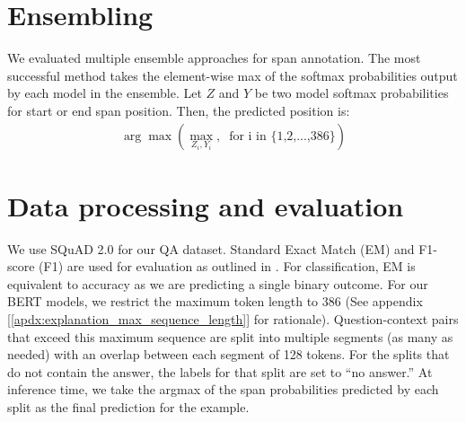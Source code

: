 \section{Ensembling} 

We evaluated multiple ensemble approaches for span annotation. The most successful method takes the element-wise max of the softmax probabilities output by each model in the ensemble. Let $Z$ and $Y$ be two model softmax probabilities for start or end span position. Then, the predicted position is:
\begin{equation} \label{eq2}
\begin{aligned}
\arg\max\left(\underset{{Z_i, Y_i}}{\max},\;\;\text{for i in \{1,2,...,386\}}\right)
\end{aligned}
\end{equation}

\section{Data processing and evaluation}

We use SQuAD 2.0 for our QA dataset. Standard Exact Match (EM) and F1-score (F1) are used for evaluation as outlined in \cite{DBLP:journals/corr/abs-1806-03822}. For classification, EM is equivalent to accuracy as we are predicting a single binary outcome. For our BERT models, we restrict the maximum token length to 386 (See appendix [\ref{apdx:explanation_max_sequence_length}] for rationale). Question-context pairs that exceed this maximum sequence are split into multiple segments (as many as needed) with an overlap between each segment of 128 tokens. For the splits that do not contain the answer, the labels for that split are set to “no answer.” At inference time, we take the argmax of the span probabilities predicted by each split as the final prediction for the example.
\endgroup